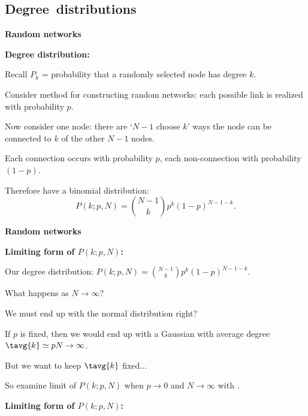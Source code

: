 \begin{frame}[label=]
\begin{frame}[label=]
\begin{frame}[label=]
\begin{frame}[label=]
\begin{frame}[label=]
  

\subsection{Degree\ distributions}

  \textbf{Random networks}
  
  \textbf{Degree distribution:}
    
     
      Recall $P_k$ = probability that a randomly
      selected node has degree $k$.
     
      Consider method  for constructing
      random networks: each possible link is realized
      with probability $p$.
     
      Now consider one node: there are `$N-1$ choose $k$'
      ways the node can be connected to $k$ of 
      the other $N-1$ nodes.
    
      Each connection occurs with probability $p$,
      each non-connection with probability $(1-p)$.
     
      Therefore have a binomial distribution:
      $$
      P(k;p,N) = \binom{N-1}{k} p^k (1-p)^{N-1-k}.
      $$
  
  

\begin{frame}[label=]
  \textbf{Random networks}

  \textbf{Limiting form of $P(k;p,N)$:}
    
    
      Our degree distribution:
      $
      P(k;p,N) = \binom{N-1}{k} p^k (1-p)^{N-1-k}.
      $
    
      What happens as $N \rightarrow \infty$?
    
      We must end up with the normal distribution right?
    
      If $p$ is fixed, then we would end up
      with a Gaussian with average 
      degree $\tavg{k} \simeq pN \rightarrow \infty$.
    
      But we want to keep $\tavg{k}$ fixed...
    
      So examine limit of $P(k;p,N)$
      when \alert{$p \rightarrow 0$} and \alert{$N \rightarrow \infty$}
      with .
    
  


\begin{frame}[label=]
  \textbf{Limiting form of $P(k;p,N)$:}

    \small
    

\end{frame}
\end{frame}
\end{frame}
\end{frame}
\end{frame}
\end{frame}
\end{frame}
